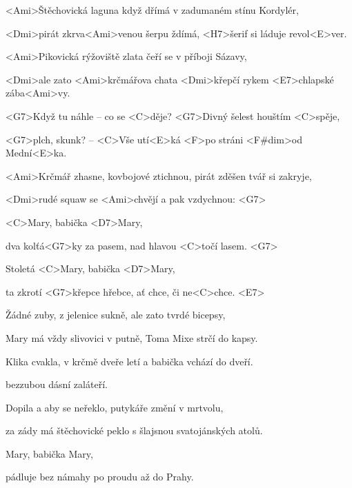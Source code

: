 

\zs
<Ami>Štěchovická laguna když dřímá v zadumaném stínu Kordylér,

<Dmi>pirát zkrva<Ami>venou šerpu ždímá, <H7>šerif si láduje revol<E>ver.

\bigskip

<Ami>Pikovická rýžoviště zlata čeří se v příboji Sázavy,

<Dmi>ale zato <Ami>krčmářova chata <Dmi>křepčí rykem <E7>chlapské zába<Ami>vy.

\bigskip

<G7>Když tu náhle -- co se <C>děje? <G7>Divný šelest houštím <C>spěje,

<G7>plch, skunk? -- <C>Vše utí<E>ká <F>po stráni <F#dim>od Mední<E>ka.

\bigskip

<Ami>Krčmář zhasne, kovbojové ztichnou, pirát zděšen tvář si zakryje,

<Dmi>rudé squaw se <Ami>chvějí a pak vzdychnou:
<G7> \ks

\zr
<C>Mary, babička <D7>Mary,

dva kolťá<G7>ky za pasem, nad hlavou <C>točí lasem. <G7>

Stoletá <C>Mary, babička <D7>Mary,

ta zkrotí <G7>křepce hřebce, ať chce, či ne<C>chce. <E7>
\kr

\zs
Žádné zuby, z jelenice sukně, ale zato tvrdé bicepsy,

Mary má vždy slivovici v putně, Toma Mixe strčí do kapsy.

\bigskip

Klika cvakla, v krčmě dveře letí a babička vchází do dveří.

 bezzubou dásní zaláteří.

\bigskip


\bigskip

Dopila a aby se neřeklo, putykáře změní v mrtvolu,

za zády má štěchovické peklo s šlajsnou svatojánských atolů.
\ks

\zr
Mary, babička Mary,

pádluje bez námahy po proudu až do Prahy.

